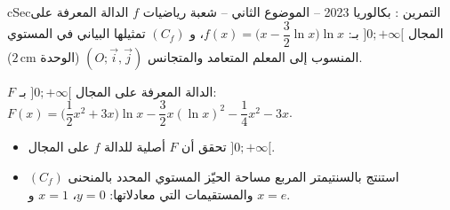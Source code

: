 \documentclass[12pt,a4paper]{article}
\newenvironment{BOX}[2]{\begin{otherlanguage}{english}\begin{arbox}{#1}{#2}}{\end{arbox}\end{otherlanguage}}
\newcounter{exo}
\newenvironment{tamrin}[1]{\stepcounter{exo}\begin{BOX}{cSec}{التمرين \theexo: #1}}{\end{BOX}}
\newenvironment{sq}{\begin{itemize}[leftmargin=2.4em,itemsep=3pt]}{\end{itemize}}
\newcommand{\qa}{\item[(أ)]}\newcommand{\qb}{\item[(ب)]}\newcommand{\qc}{\item[(جـ)]}\newcommand{\qd}{\item[(د)]}\newcommand{\qe}{\item[(هـ)]}
\begin{document}
\begin{tamrin}{بكالوريا 2023 -- الموضوع الثاني -- شعبة رياضيات}
$f$ الدالة المعرفة على المجال $]0;+\infty[$ بـ: $f(x)=\Big(x-\dfrac32\ln x\Big)\ln x$، و $(C_f)$ تمثيلها البياني في المستوي المنسوب إلى المعلم المتعامد والمتجانس $(O;\vec i,\vec j)$ (الوحدة $2\,\text{cm}$).

$F$ الدالة المعرفة على المجال $]0;+\infty[$ بـ: $F(x)=\Big(\dfrac12x^2+3x\Big)\ln x-\dfrac32x(\ln x)^2-\dfrac14x^2-3x$.
\begin{sq}
\qa تحقق أن $F$ أصلية للدالة $f$ على المجال $]0;+\infty[$.
\qb استنتج بالسنتيمتر المربع مساحة الحيّز المستوي المحدد بالمنحنى $(C_f)$ والمستقيمات التي معادلاتها: $y=0$، $x=1$ و $x=e$.
\end{sq}
\end{tamrin}
\end{document}
